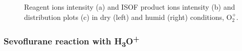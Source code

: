\begin{figure}
\caption{Reagent ions intensity (a) and ISOF product ions intensity (b) and distribution plots (c) in dry (left) and humid (right) conditions, O$_2^+$.}
\label{fig:isof_o2}
\end{figure}


\subsubsection{Sevoflurane reaction with H\textsubscript{3}O\textsuperscript{+}}

